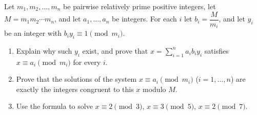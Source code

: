 Let $m_1,m_2,\dots,m_n$ be pairwise relatively prime positive integers, let $M=m_1m_2\cdots m_n$, and let $a_1,\dots,a_n$ be integers. For each $i$ let $b_i=\dfrac{M}{m_i}$, and let $y_i$ be an integer with $b_iy_i\equiv1\pmod{m_i}$.
\begin{enumerate}
\item[(a)] Explain why such $y_i$ exist, and prove that $x=\sum_{i=1}^{n}a_ib_iy_i$ satisfies $x\equiv a_i\pmod{m_i}$ for every $i$.
\item[(b)] Prove that the solutions of the system $x\equiv a_i\pmod{m_i}$ ($i=1,\dots,n$) are exactly the integers congruent to this $x$ modulo $M$.
\item[(c)] Use the formula to solve $x\equiv2\pmod3$, $x\equiv3\pmod5$, $x\equiv2\pmod7$.
\end{enumerate}
